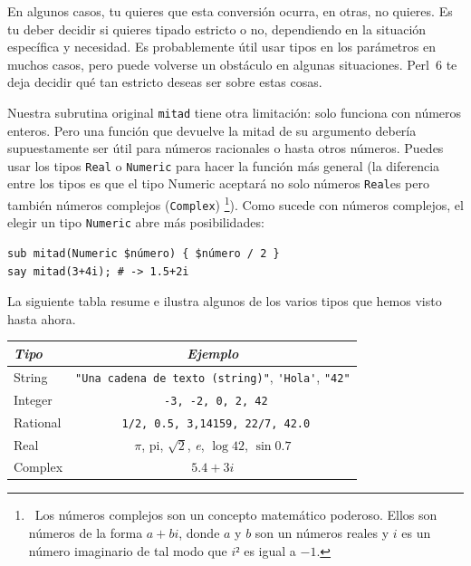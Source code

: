 En algunos casos, tu quieres que esta conversión ocurra,
en otras, no quieres. Es tu deber decidir si quieres
tipado estricto o no, dependiendo en la
situación específica y necesidad. Es probablemente útil usar 
tipos en los parámetros en muchos casos, pero puede 
volverse un obstáculo en algunas situaciones. Perl~6 te deja 
decidir qué tan estricto deseas ser sobre estas cosas.

Nuestra subrutina original {\tt mitad} tiene otra limitación: 
solo funciona con números enteros. Pero una función que 
devuelve la mitad de su argumento debería supuestamente
ser útil para números racionales o hasta otros números. 
Puedes usar los tipos {\tt Real}  o {\tt Numeric} para
hacer la función más general (la diferencia entre los
tipos  es que el tipo {Numeric} aceptará no solo números
{\tt Real}es pero también números complejos ({\tt Complex})
\footnote{~Los números complejos son un concepto matemático
poderoso. Ellos son números de la forma $a + bi$, donde 
$a$ y $b$ son un números reales y $i$ es un número imaginario
de tal modo que $i²$ es igual a $-1$.}). Como sucede con
números complejos, el elegir un tipo {\tt Numeric} abre más 
posibilidades:

\begin{lstlisting}
sub mitad(Numeric $número) { $número / 2 }
say mitad(3+4i); # -> 1.5+2i
\end{lstlisting}

La siguiente tabla resume e ilustra  algunos de los varios
tipos que hemos visto hasta ahora.

\begin{center}
\begin{tabular}{|l|c|}  \hline
\label{types}
\emph{Tipo} & \emph{Ejemplo}   \\ \hline
String      & \verb'"Una cadena de texto (string)"', \verb"'Hola'", \verb'"42"' \\ \hline
Integer     & \verb' -3, -2, 0, 2, 42' \\ \hline
Rational    & \verb' 1/2, 0.5, 3,14159, 22/7, 42.0' \\ \hline
Real        & $\pi$, pi, $\surd{2}$, \emph{e}, $\log 42$, $\sin 0.7$\\ \hline
Complex     & $5.4 + 3i$ \\ \hline
\end{tabular}
\end{center}



